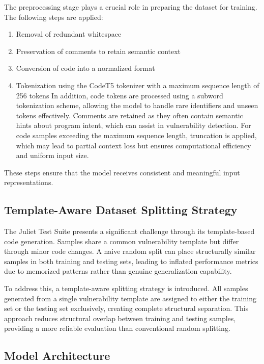 \documentclass[conference]{IEEEtran}
\begin{document}
The preprocessing stage plays a crucial role in preparing the dataset for training. The following steps are applied:
\begin{enumerate}
    \item Removal of redundant whitespace
    \item Preservation of comments to retain semantic context
    \item Conversion of code into a normalized format
    \item Tokenization using the CodeT5 tokenizer with a maximum sequence length of 256 tokens
    In addition, code tokens are processed using a subword tokenization scheme, allowing the model to handle rare identifiers and unseen tokens effectively. Comments are retained as they often contain semantic hints about program intent, which can assist in vulnerability detection. For code samples exceeding the maximum sequence length, truncation is applied, which may lead to partial context loss but ensures computational efficiency and uniform input size.
\end{enumerate}
These steps ensure that the model receives consistent and meaningful input representations.

\subsection{Template-Aware Dataset Splitting Strategy}

The Juliet Test Suite presents a significant challenge through its template-based code generation. Samples share a common vulnerability template but differ through minor code changes. A naive random split can place structurally similar samples in both training and testing sets, leading to inflated performance metrics due to memorized patterns rather than genuine generalization capability.

To address this, a template-aware splitting strategy is introduced. All samples generated from a single vulnerability template are assigned to either the training set or the testing set exclusively, creating complete structural separation. This approach reduces structural overlap between training and testing samples, providing a more reliable evaluation than conventional random splitting.


\subsection{Model Architecture}
\end{document}
